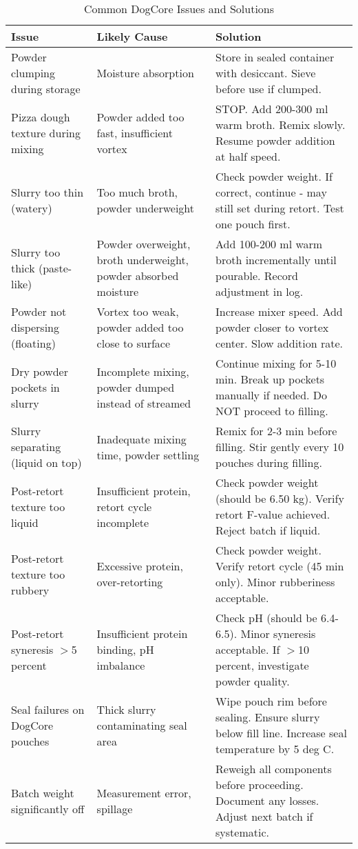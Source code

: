 \begin{table}[h]
\centering
\caption{Common DogCore Issues and Solutions}
\label{tab:troubleshooting_dogcore}
\begin{tabular}{@{}p{4cm}p{3.5cm}p{5cm}@{}}
\toprule
\textbf{Issue} & \textbf{Likely Cause} & \textbf{Solution} \\
\midrule
Powder clumping during storage & Moisture absorption & Store in sealed container with desiccant. Sieve before use if clumped. \\
\midrule
Pizza dough texture during mixing & Powder added too fast, insufficient vortex & STOP. Add 200-300 ml warm broth. Remix slowly. Resume powder addition at half speed. \\
\midrule
Slurry too thin (watery) & Too much broth, powder underweight & Check powder weight. If correct, continue - may still set during retort. Test one pouch first. \\
\midrule
Slurry too thick (paste-like) & Powder overweight, broth underweight, powder absorbed moisture & Add 100-200 ml warm broth incrementally until pourable. Record adjustment in log. \\
\midrule
Powder not dispersing (floating) & Vortex too weak, powder added too close to surface & Increase mixer speed. Add powder closer to vortex center. Slow addition rate. \\
\midrule
Dry powder pockets in slurry & Incomplete mixing, powder dumped instead of streamed & Continue mixing for 5-10 min. Break up pockets manually if needed. Do NOT proceed to filling. \\
\midrule
Slurry separating (liquid on top) & Inadequate mixing time, powder settling & Remix for 2-3 min before filling. Stir gently every 10 pouches during filling. \\
\midrule
Post-retort texture too liquid & Insufficient protein, retort cycle incomplete & Check powder weight (should be 6.50 kg). Verify retort F-value achieved. Reject batch if liquid. \\
\midrule
Post-retort texture too rubbery & Excessive protein, over-retorting & Check powder weight. Verify retort cycle (45 min only). Minor rubberiness acceptable. \\
\midrule
Post-retort syneresis $>$5 percent & Insufficient protein binding, pH imbalance & Check pH (should be 6.4-6.5). Minor syneresis acceptable. If $>$10 percent, investigate powder quality. \\
\midrule
Seal failures on DogCore pouches & Thick slurry contaminating seal area & Wipe pouch rim before sealing. Ensure slurry below fill line. Increase seal temperature by 5 deg C. \\
\midrule
Batch weight significantly off & Measurement error, spillage & Reweigh all components before proceeding. Document any losses. Adjust next batch if systematic. \\
\bottomrule
\end{tabular}
\end{table}

